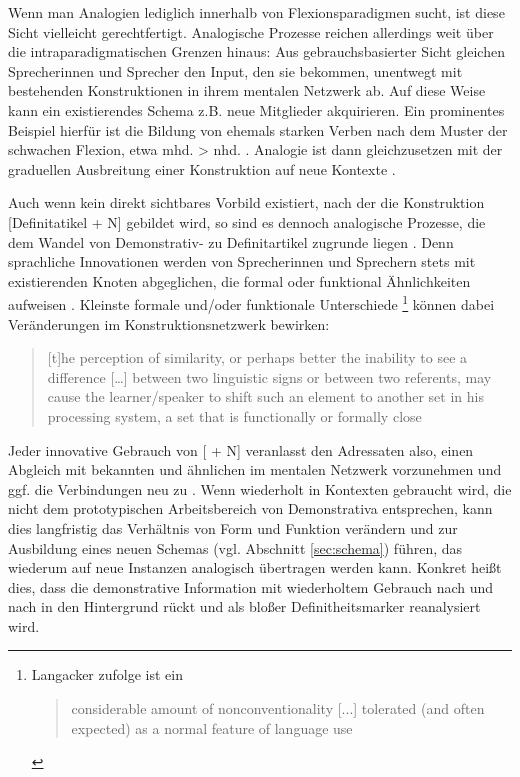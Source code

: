 Wenn man Analogien lediglich innerhalb von Flexionsparadigmen sucht, ist diese Sicht vielleicht gerechtfertigt. Analogische Prozesse reichen allerdings weit über die intraparadigmatischen Grenzen hinaus: Aus gebrauchsbasierter Sicht gleichen Sprecherinnen und Sprecher den Input, den sie bekommen, unentwegt mit bestehenden Konstruktionen in ihrem mentalen Netzwerk ab. Auf diese Weise kann ein existierendes Schema z.B. neue Mitglieder akquirieren. Ein prominentes Beispiel hierfür ist die Bildung von ehemals starken Verben nach dem Muster der schwachen Flexion, etwa mhd.  > nhd.  \parencite[s.][]{Bittner1985}. Analogie ist dann gleichzusetzen mit der graduellen Ausbreitung einer Konstruktion auf neue Kontexte \parencite[57f.]{Bybee2010}. %

Auch wenn kein direkt sichtbares Vorbild existiert, nach der die Konstruktion [Definitatikel + N] gebildet wird, so sind es dennoch analogische Prozesse, die dem  Wandel von Demonstrativ- zu Definitartikel zugrunde liegen \parencite[eine ähnliche Perspektive nimmt auch Sommerer bei der Entwicklung des engl. Definitartikels ein, s.][]{Sommerer2011}. Denn sprachliche Innovationen werden von Sprecherinnen und Sprechern stets mit existierenden Knoten abgeglichen, die formal oder funktional Ähnlichkeiten aufweisen \parencite[51]{Traugott2013}. Kleinste formale und/oder funktionale Unterschiede
\footnote{Langacker zufolge ist ein \blockcquote[69]{Langacker1987}{considerable amount of nonconventionality [...] tolerated (and often expected) as a normal feature of language use}.}
 können dabei Veränderungen im Konstruktionsnetzwerk bewirken:  \blockcquote[324]{Fischer2007} {[t]he perception of similarity, or perhaps better the inability to see a difference […] between two linguistic signs or between two referents, may cause the learner/speaker to shift such an element to another set in his processing system, a set that is functionally or formally close}. Jeder innovative Gebrauch von [ + N] veranlasst den Adressaten also, einen Abgleich mit bekannten und ähnlichen  \parencite[60]{Bybee2010} im mentalen Netzwerk vorzunehmen und ggf. die Verbindungen neu zu . Wenn  wiederholt in Kontexten gebraucht wird, die nicht dem prototypischen Arbeitsbereich von Demonstrativa entsprechen, kann dies langfristig das Verhältnis von Form und Funktion verändern und zur Ausbildung eines neuen Schemas (vgl. Abschnitt \ref{sec:schema}) führen, das wiederum auf neue Instanzen analogisch übertragen werden kann. Konkret heißt dies, dass die demonstrative Information mit wiederholtem Gebrauch nach und nach in den Hintergrund rückt und  als bloßer Definitheitsmarker reanalysiert wird.

